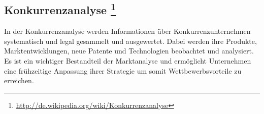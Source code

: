 \subsection[Konkurrenzanalyse]{Konkurrenzanalyse \footnote{\url{http://de.wikipedia.org/wiki/Konkurrenzanalyse}}}
In der Konkurrenzanalyse werden Informationen über Konkurrenzunternehmen systematisch und legal gesammelt und ausgewertet. Dabei werden ihre Produkte, Marktentwicklungen, neue Patente und Technologien beobachtet und analysiert. Es ist ein wichtiger Bestandteil der Marktanalyse und ermöglicht Unternehmen eine frühzeitige Anpassung ihrer Strategie um somit Wettbewerbsvorteile zu erreichen.
